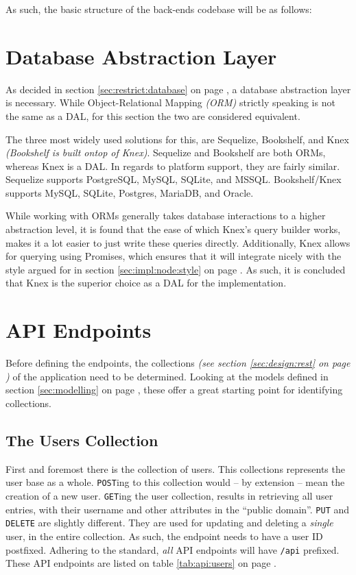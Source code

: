 		As such, the basic structure of the back-ends codebase will be as follows:

	\section{Database Abstraction Layer}
		As decided in section \ref{sec:restrict:database} on page \pageref{sec:restrict:database}, a database abstraction layer is necessary. While Object-Relational Mapping \emph{(ORM)} strictly speaking is not the same as a DAL, for this section the two are considered equivalent.

		The three most widely used solutions for this, are Sequelize, Bookshelf, and Knex \emph{(Bookshelf is built ontop of Knex)}. Sequelize and Bookshelf are both ORMs, whereas Knex is a DAL. In regards to platform support, they are fairly similar. Sequelize supports PostgreSQL, MySQL, SQLite, and MSSQL. Bookshelf/Knex supports MySQL, SQLite, Postgres, MariaDB, and Oracle.

		While working with ORMs generally takes database interactions to a higher abstraction level, it is found that the ease of which Knex's query builder works, makes it a lot easier to just write these queries directly. Additionally, Knex allows for querying using Promises, which ensures that it will integrate nicely with the style argued for in section \ref{sec:impl:node:style} on page \pageref{sec:impl:node:style}. As such, it is concluded that Knex is the superior choice as a DAL for the implementation.

	\section{API Endpoints}
		\label{sec:impl:api}
		Before defining the endpoints, the collections \emph{(see section \ref{sec:design:rest} on page \pageref{sec:design:rest})} of the application need to be determined. Looking at the models defined in section \ref{sec:modelling} on page \pageref{sec:modelling}, these offer a great starting point for identifying collections.

		\subsection{The Users Collection}
			First and foremost there is the collection of users. This collections represents the user base as a whole. \verb=POST=ing to this collection would -- by extension -- mean the creation of a new user. \verb=GET=ing the user collection, results in retrieving all user entries, with their username and other attributes in the ``public domain''. \verb=PUT= and \verb=DELETE= are slightly different. They are used for updating and deleting a \emph{single} user, in the entire collection. As such, the endpoint needs to have a user ID postfixed. Adhering to the standard, \emph{all} API endpoints will have \verb=/api= prefixed. These API endpoints are listed on table \ref{tab:api:users} on page \pageref{tab:api:users}.

